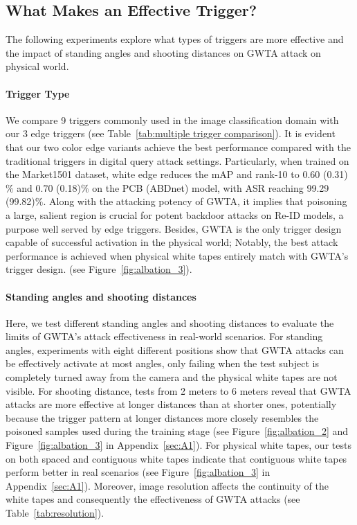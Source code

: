 \documentclass[sigconf,authordraft]{acmart}
\begin{document}
\subsection{What Makes an Effective Trigger?}
The following experiments explore what types of triggers are more effective and the impact of standing angles and shooting distances on GWTA attack on physical world.

\paragraph{Trigger Type} 
We compare 9 triggers commonly used in the image classification domain with our 3 edge triggers (see Table~\ref{tab:multiple trigger comparison}).
It is evident that our two color edge variants achieve the best performance compared with the traditional triggers in digital query attack settings. Particularly, when trained on the Market1501 dataset, white edge reduces the mAP and rank-10 to 0.60 (0.31)$\%$ and 0.70 (0.18)$\%$ on the PCB (ABDnet) model, with ASR reaching 99.29 (99.82)$\%$. Along with the attacking potency of GWTA, it implies that poisoning a large, salient region is crucial for potent backdoor attacks on Re-ID models, a purpose well served by edge triggers. Besides, GWTA is the only trigger design capable of successful activation in the physical world; Notably, the best attack performance is achieved when physical white tapes entirely match with GWTA's trigger design. (see Figure~\ref{fig:albation_3}).



\paragraph{Standing angles and shooting distances} 
Here, we test different standing angles and shooting distances to evaluate the limits of GWTA's attack effectiveness in real-world scenarios. For standing angles, experiments with eight different positions show that GWTA attacks can be effectively activate at most angles, only failing when the test subject is completely turned away from the camera and the physical white tapes are not visible. For shooting distance, tests from 2 meters to 6 meters reveal that GWTA attacks are more effective at longer distances than at shorter ones, potentially because the trigger pattern at longer distances more closely resembles the poisoned samples used during the training stage (see Figure~\ref{fig:albation_2} and Figure~\ref{fig:albation_3} in Appendix~\ref{sec:A1}). For physical white tapes, our tests on both spaced and contiguous white tapes indicate that contiguous white tapes perform better in real scenarios (see Figure~\ref{fig:albation_3} in Appendix~\ref{sec:A1}). Moreover, image resolution affects the continuity of the white tapes and consequently the effectiveness of GWTA attacks (see Table~\ref{tab:resolution}).
\end{document}
